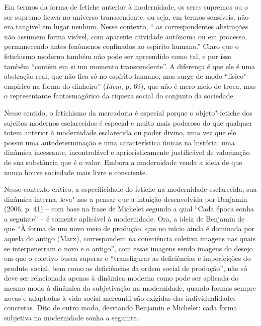 Em termos da forma de fetiche anterior à modernidade, os seres supremos
ou o ser supremo ficava no universo transcendente, ou seja, em termos
sensíveis, não era tangível em lugar nenhum. Nesse contexto, `` as
correspondentes abstrações não assumem forma visível, com aparente
atividade autônoma ou em processo, permanecendo antes fenômenos
confinados ao espírito humano.'' Claro que o fetichismo moderno também
não pode ser apreendido como tal, e por isso também ``contém em si um
momento transcendente''. A diferença é que ele é uma abstração real, que
não fica só no espírito humano, mas surge de modo ``físico"-empírico na
forma do dinheiro'' (\emph{Idem}, p. 69), que não é mero meio de troca,
mas o representante fantasmagórico da riqueza social do conjunto da
sociedade.

Nesse sentido, o fetichismo da mercadoria é especial porque o
objeto"-fetiche dos sujeitos modernos esclarecidos é especial e muito
mais poderoso do que qualquer totem anterior à modernidade esclarecida
ou poder divino, uma vez que ele possui uma autodeterminação e uma
característica únicas na história: uma dinâmica incessante,
incontrolável e aprioristicamente justificável de valorização de sua
substância que é o valor. Embora a modernidade venda a ideia de que
nunca houve sociedade mais livre e consciente.

Nesse contexto crítico, a especificidade do fetiche na modernidade
esclarecida, sua dinâmica interna, leva"-nos a pensar que a intuição
desenvolvida por Benjamin (2006, p. 41) -- com base na frase de Michelet
segundo a qual ``Cada época sonha a seguinte'' -- é somente aplicável à modernidade.
Ora, a ideia de Benjamin de que ``À forma de um novo meio de produção,
que no início ainda é dominada por aquela do antigo (Marx), correspondem
na consciência coletiva imagens nas quais se interpenetram o novo e o
antigo'', com essas imagens sendo imagens do desejo em que o coletivo
busca superar e ``transfigurar as deficiências e imperfeições do produto
social, bem como as deficiências da ordem social de produção'', não só
deve ser relacionada apenas à dinâmica moderna como pode ser aplicada do
mesmo modo à dinâmica da subjetivação na modernidade, quando formas
sempre novas e adaptadas à vida social mercantil são exigidas das
individualidades concretas. Dito de outro modo, desviando Benjamin e
Michelet: cada forma subjetiva na modernidade sonha a seguinte.

